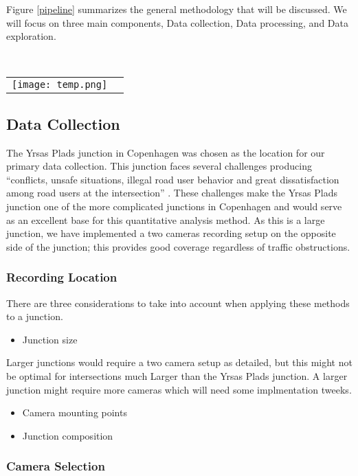 
Figure \ref{pipeline} summarizes the general methodology that will be discussed. We will focus
on three main components, Data collection, Data processing, and Data exploration.

\ \\ 
\noindent
\begin{tabular}{@{}cc}
\texttt{[image: temp.png]} 
\end{tabular}
\label{pipeline}

\subsection{Data Collection}

The Yrsas Plads junction in Copenhagen was chosen as the location for our primary data collection. 
This junction faces several challenges producing “conflicts, unsafe situations, illegal road user behavior and great dissatisfaction among road users at the intersection” \cite{CPHpost_2021}.
These challenges make the Yrsas Plads junction one of the more complicated junctions in Copenhagen and would serve as an excellent base for this quantitative analysis method. 
As this is a large junction, we have implemented a two cameras recording setup on the opposite side of the junction; this provides good coverage regardless of traffic obstructions.
\subsubsection{Recording Location}

There are three considerations to take into account when applying these methods to a junction.
\begin{itemize}
	\item Junction size
\end{itemize}
Larger junctions would require a two camera setup as detailed, but this might not be optimal for intersections much Larger
than the Yrsas Plads junction. A larger junction might require more cameras which will need some implmentation tweeks.
\begin{itemize}
	\item Camera mounting points
\end{itemize}
\begin{itemize}
	\item Junction composition
\end{itemize}

\subsubsection{Camera Selection}

